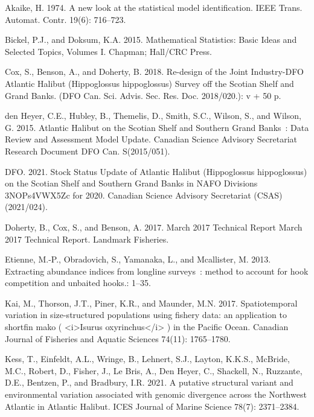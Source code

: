 \documentclass[12pt]{article}\usepackage[]{graphicx}\usepackage[]{color}
\begin{document}
\noindent \vspace{-2em} \setlength{\parindent}{-0.2in} \setlength{\leftskip}{0.2in} \setlength{\parskip}{8pt}

\hypertarget{refs}{}
\leavevmode\hypertarget{ref-Akaike1974}{}%
Akaike, H. 1974. A new look at the statistical model identification. IEEE Trans. Automat. Contr. 19(6): 716--723.

\leavevmode\hypertarget{ref-Bickel2015}{}%
Bickel, P.J., and Doksum, K.A. 2015. Mathematical Statistics: Basic Ideas and Selected Topics, Volumes I. Chapman; Hall/CRC Press.

\leavevmode\hypertarget{ref-Cox2018}{}%
Cox, S., Benson, A., and Doherty, B. 2018. Re-design of the Joint Industry-DFO Atlantic Halibut (Hippoglossus hippoglossus) Survey off the Scotian Shelf and Grand Banks. (DFO Can. Sci. Advis. Sec. Res. Doc. 2018/020.): v + 50 p.

\leavevmode\hypertarget{ref-DenHeyer2015}{}%
den Heyer, C.E., Hubley, B., Themelis, D., Smith, S.C., Wilson, S., and Wilson, G. 2015. Atlantic Halibut on the Scotian Shelf and Southern Grand Banks~: Data Review and Assessment Model Update. Canadian Science Advisory Secretariat Research Document DFO Can. S(2015/051).

\leavevmode\hypertarget{ref-DFO2021}{}%
DFO. 2021. Stock Status Update of Atlantic Halibut (Hippoglossus hippoglossus) on the Scotian Shelf and Southern Grand Banks in NAFO Divisions 3NOPs4VWX5Zc for 2020. Canadian Science Advisory Secretariat (CSAS) (2021/024).

\leavevmode\hypertarget{ref-Doherty2017}{}%
Doherty, B., Cox, S., and Benson, A. 2017. March 2017 Technical Report March 2017 Technical Report. Landmark Fisheries.

\leavevmode\hypertarget{ref-Etienne2013}{}%
Etienne, M.-P., Obradovich, S., Yamanaka, L., and Mcallister, M. 2013. Extracting abundance indices from longline surveys~: method to account for hook competition and unbaited hooks.: 1--35.

\leavevmode\hypertarget{ref-Kai2017}{}%
Kai, M., Thorson, J.T., Piner, K.R., and Maunder, M.N. 2017. Spatiotemporal variation in size-structured populations using fishery data: an application to shortfin mako ( \textless i\textgreater Isurus oxyrinchus\textless/i\textgreater{} ) in the Pacific Ocean. Canadian Journal of Fisheries and Aquatic Sciences 74(11): 1765--1780.

\leavevmode\hypertarget{ref-Kess2021}{}%
Kess, T., Einfeldt, A.L., Wringe, B., Lehnert, S.J., Layton, K.K.S., McBride, M.C., Robert, D., Fisher, J., Le Bris, A., Den Heyer, C., Shackell, N., Ruzzante, D.E., Bentzen, P., and Bradbury, I.R. 2021. A putative structural variant and environmental variation associated with genomic divergence across the Northwest Atlantic in Atlantic Halibut. ICES Journal of Marine Science 78(7): 2371--2384.
\end{document}
